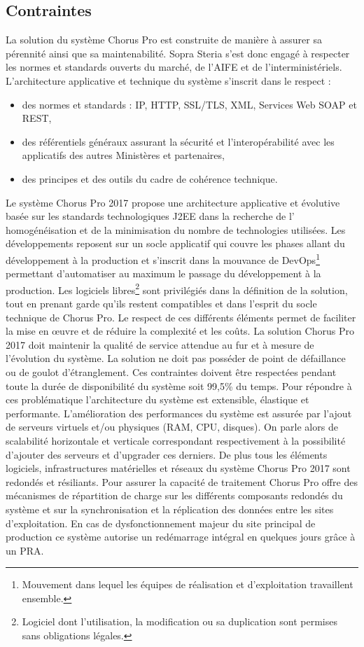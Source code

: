\documentclass[12pt,a4paper]{article}
\begin{document}
\subsection{Contraintes}
La solution du système Chorus Pro est construite de manière à assurer sa pérennité ainsi que sa maintenabilité. Sopra Steria s'est donc engagé à respecter les normes et standards ouverts du marché, de l'AIFE et de l'interministériels. L’architecture applicative et technique du système s’inscrit dans le respect :
\smallbreak
\begin{itemize}
\item	des normes et standards : IP, HTTP, SSL/TLS, XML, Services Web \gls{SOAP} et \gls{REST},
\item	des référentiels généraux assurant la sécurité et l’interopérabilité avec les applicatifs des autres Ministères et partenaires,
\item	des principes et des outils du cadre de cohérence technique.
\end{itemize}
\medbreak
Le système Chorus Pro 2017 propose une architecture applicative et évolutive basée sur les standards technologiques \gls{J2EE} dans la recherche de l’ homogénéisation et de la minimisation du nombre de technologies utilisées. Les développements reposent sur un socle applicatif qui couvre les phases allant du développement à la production et s’inscrit dans la mouvance de DevOps\footnote{Mouvement dans lequel les équipes de réalisation et d'exploitation travaillent ensemble.} permettant d’automatiser au maximum le passage du développement à la production. Les logiciels libres\footnote{Logiciel dont l'utilisation, la modification ou sa duplication sont permises sans obligations légales.} sont privilégiés dans la définition de la solution, tout en prenant garde qu’ils restent compatibles et dans l’esprit du socle technique de Chorus Pro. Le respect de ces différents éléments permet de faciliter la mise en œuvre et de réduire la complexité et les coûts.
\smallbreak
La solution Chorus Pro 2017 doit maintenir la qualité de service attendue au fur et à mesure de l’évolution du système. La solution ne doit pas posséder de point de défaillance ou de goulot d'étranglement. Ces contraintes doivent être respectées pendant toute la durée de disponibilité du système soit 99,5\% du temps.
\smallbreak
Pour répondre à ces problématique l'architecture du système est extensible, élastique et performante. L'amélioration des performances du système est assurée par l'ajout de serveurs virtuels et/ou physiques (\gls{RAM}, \gls{CPU}, disques). On parle alors de scalabilité horizontale et verticale correspondant respectivement à la possibilité d'ajouter des serveurs et d'upgrader ces derniers.
\smallbreak
De plus tous les éléments logiciels, infrastructures matérielles et réseaux du système Chorus Pro 2017 sont redondés et résiliants. Pour assurer la capacité de traitement Chorus Pro offre des mécanismes de répartition de charge sur les différents composants redondés du système et sur la synchronisation et la réplication des données entre les sites d’exploitation. En cas de dysfonctionnement majeur du site principal de production ce système autorise un redémarrage intégral en quelques jours grâce à un \gls{PRA}.  
\end{document}
